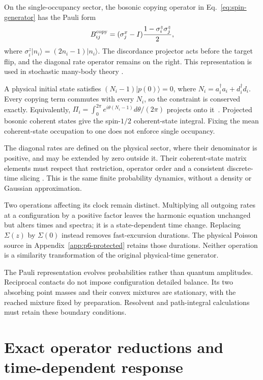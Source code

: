 \documentclass[aps,pre,reprint,amsmath,amssymb,longbibliography]{revtex4-2}
\makeatletter
\newcommand{\labelalias}[2]{\@ifundefined{r@#2}{}{%
\protected@write\@auxout{}{\string\newlabel{#1}{\csname r@#2\endcsname}}}}
\makeatother
\begin{document}
On the single-occupancy sector, the bosonic copying operator in
Eq.~\eqref{eq:spin-generator} has the Pauli form
\labelalias{eq:doi}{eq:spin-generator}
\begin{equation}
 B_{ij}^{\rm copy}=(\sigma_j^x-I)
                  \frac{1-\sigma_i^z\sigma_j^z}{2},
 \label{eq:app-copy-pauli}
\end{equation}
where $\sigma_i^z|n_i\rangle=(2n_i-1)|n_i\rangle$.
The discordance projector acts before the target flip, and the diagonal
rate operator remains on the right.
This representation is used in stochastic many-body
theory \cite{AlcarazEtAl1994,Schutz2001,DelRazoLammaMerbis2026}.

A physical initial state satisfies $(N_i-1)|p(0)\rangle=0$,
where $N_i=a_i^\dagger a_i+d_i^\dagger d_i$. Every copying term
commutes with every $N_i$, so the constraint is conserved exactly.
Equivalently,
$\Pi_i=\int_0^{2\pi}e^{i\theta(N_i-1)}d\theta/(2\pi)$ projects
onto it~\cite{Sachdev2025}. Projected bosonic coherent states
give the spin-$1/2$ coherent-state integral. Fixing the mean coherent-state
occupation to one does not enforce single occupancy.

The diagonal rates are defined on the physical sector, where their
denominator is positive, and may be extended by zero outside it.
Their coherent-state matrix elements must respect that restriction,
operator order and a consistent discrete-time slicing
\cite{ShibataTakagi1999}. This is the same finite
probability dynamics, without a density or Gaussian approximation.

Two operations affecting its clock remain distinct. Multiplying all
outgoing rates at a configuration by a positive factor leaves the
harmonic equation unchanged but alters times and spectra; it is a
state-dependent time change. Replacing $\Sigma(z)$ by $\Sigma(0)$
instead removes fast-excursion durations. The physical Poisson source
in Appendix~\ref{app:p6-protected} retains those durations.
Neither operation is a similarity transformation of the original
physical-time generator.

The Pauli representation evolves probabilities rather than quantum
amplitudes. Reciprocal contacts do not impose configuration detailed
balance. Its two absorbing point masses and their convex mixtures are
stationary, with the reached mixture fixed by preparation. Resolvent
and path-integral calculations must retain these boundary conditions.

\section{Exact operator reductions and time-dependent response}
\label{app:v3-operator-response}
\end{document}
